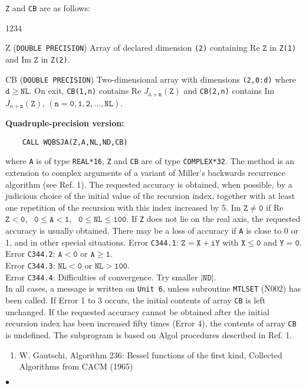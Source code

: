 {\tt Z} and {\tt CB} are as follows:
\begin{DLtt}{1234}
\item [Z]({\tt DOUBLE PRECISION}) Array of declared dimension {\tt (2)}
containing Re $\mathtt{Z}$ in {\tt Z(1)} and Im $\mathtt{Z}$ in
{\tt Z(2)}.
\item[CB] ({\tt DOUBLE PRECISION}) Two-dimensional array with dimensions
{\tt (2,0:d)} where $\mathtt{d \ge NL}$. On exit, {\tt CB(1,n)}
contains Re $J_{a+\mathtt{n}}(\mathtt{Z})$ and
{\tt CB(2,n)} contains Im $J_{a+\mathtt{n}}(\mathtt{Z})$,
$\mathtt{(n=0,1,2,\ldots,NL)}$.
\end{DLtt}
{\bf Quadruple-precision version:}
\begin{verbatim}
    CALL WQBSJA(Z,A,NL,ND,CB)
\end{verbatim}
where {\tt A} is of type {\tt REAL*16}, {\tt Z} and {\tt CB}
are of type {\tt COMPLEX*32}.
\Method
The method is an extension to complex arguments of a
variant of Miller's backwards recurrence algorithm (see Ref. 1).
The requested accuracy is obtained, when possible, by a judicious
choice of the initial value of the recursion index, together with at
least one repetition of the recursion with this index increased by 5.
\Restrict
Im $\mathtt{Z \ne 0}$ if Re $\mathtt{Z < 0}$,
\ $\mathtt{0 \leq A < 1}$, \ $\mathtt{0 \leq NL \leq 100}$.
\newpage
\Accuracy
If {\tt Z} does not lie on the real axis, the requested
accuracy is usually obtained. There may be a loss of accuracy
if {\tt A} is close to 0 or 1, and in other special situations.
\Errorh
Error {\tt C344.1}: $\mathtt{Z=X+iY}$ with $\mathtt{X \le 0}$
and $\mathtt{Y=0}$.\\
Error {\tt C344.2}: $\mathtt{A<0}$ or $\mathtt{A \ge 1}$. \\
Error {\tt C344.3}: $\mathtt{NL<0}$ or $\mathtt{NL>100}$. \\
Error {\tt C344.4}: Difficulties of convergence. Try smaller
$\mathtt{|ND|}$. \\
In all cases, a message is written on
{\tt Unit 6}, unless subroutine {\tt MTLSET} (N002) has been called.
If Error 1 to 3 occurs, the initial contents of array {\tt CB}
is left unchanged.
If the requested accuracy cannot be obtained after the initial
recursion index has been increased fifty times (Error 4),
the contents of array {\tt CB} is undefined.
\Source
The subprogram is based on Algol procedures described in Ref. 1.
\Refer
\begin{enumerate}
\item W. Gautschi, Algorithm 236: Bessel functions of the first kind,
Collected Algorithms from CACM (1965)
\end{enumerate}
$\bullet$
